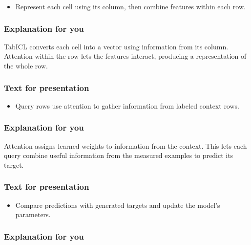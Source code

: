 \documentclass[11pt]{article}
\newenvironment{notes}
  {\begin{itemize}\setlength{\itemsep}{0.45em}\setlength{\parsep}{0pt}}
  {\end{itemize}}
\begin{document}
\begin{notes}

    \item Represent each cell using its column, then combine features within each row.

\end{notes}

\subsubsection*{Explanation for you}

TabICL converts each cell into a vector using information from its column. Attention within
the row lets the features interact, producing a representation of the whole row.

\subsubsection*{Text for presentation}

\begin{notes}

    \item Query rows use attention to gather information from labeled context rows.

\end{notes}

\subsubsection*{Explanation for you}

Attention assigns learned weights to information from the context. This lets each query
combine useful information from the measured examples to predict its target.

\subsubsection*{Text for presentation}

\begin{notes}

    \item Compare predictions with generated targets and update the model’s parameters.

\end{notes}

\subsubsection*{Explanation for you}
\end{document}
